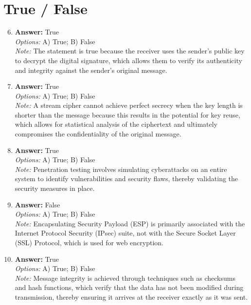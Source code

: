 \documentclass[12pt]{article}
\begin{document}
\section*{True / False}
\begin{enumerate}[label=\arabic*.]
\setcounter{enumi}{5}
\item \textbf{Answer:} True
\\ \textit{Options:} A) True; B) False
\\ \textit{Note:} The statement is true because the receiver uses the sender's public key to decrypt the digital signature, which allows them to verify its authenticity and integrity against the sender's original message.
\item \textbf{Answer:} True
\\ \textit{Options:} A) True; B) False
\\ \textit{Note:} A stream cipher cannot achieve perfect secrecy when the key length is shorter than the message because this results in the potential for key reuse, which allows for statistical analysis of the ciphertext and ultimately compromises the confidentiality of the original message.
\item \textbf{Answer:} True
\\ \textit{Options:} A) True; B) False
\\ \textit{Note:} Penetration testing involves simulating cyberattacks on an entire system to identify vulnerabilities and security flaws, thereby validating the security measures in place.
\item \textbf{Answer:} False
\\ \textit{Options:} A) True; B) False
\\ \textit{Note:} Encapsulating Security Payload (ESP) is primarily associated with the Internet Protocol Security (IPsec) suite, not with the Secure Socket Layer (SSL) Protocol, which is used for web encryption.
\item \textbf{Answer:} True
\\ \textit{Options:} A) True; B) False
\\ \textit{Note:} Message integrity is achieved through techniques such as checksums and hash functions, which verify that the data has not been modified during transmission, thereby ensuring it arrives at the receiver exactly as it was sent.
\end{enumerate}
\end{document}

